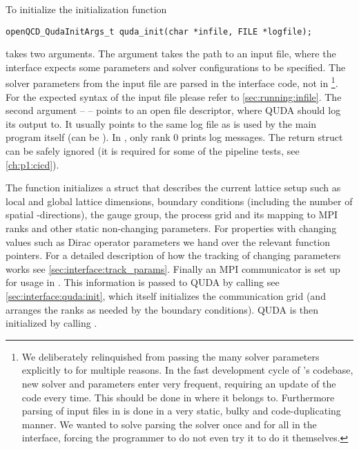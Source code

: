 To initialize \quda the initialization function
\begin{verbatim}
openQCD_QudaInitArgs_t quda_init(char *infile, FILE *logfile);
\end{verbatim}
takes two arguments.
The  argument takes the path to an input file, where the interface expects some parameters and solver configurations to be specified.
The solver parameters from the input file are parsed in the interface code, not in \openqxd\footnote{We deliberately relinquished from passing the many solver parameters explicitly to \quda for multiple reasons. In the fast development cycle of \quda's codebase, new solver and parameters enter very frequent, requiring an update of the code every time. This should be done in \quda where it belongs to. Furthermore parsing of input files in \openqxd is done in a very static, bulky and code-duplicating manner. We wanted to solve parsing the solver once and for all in the interface, forcing the programmer to do not even try it to do it themselves.}.
For the expected syntax of the input file please refer to \cref{sec:running:infile}.
The second argument --  -- points to an open file descriptor, where QUDA should log its output to.
It usually points to the same log file as is used by the main program itself (can be ).
In \quda, only rank \num{0} prints log messages.
The return struct can be safely ignored (it is required for some of the pipeline tests, see \cref{ch:p1:cicd}).

The function initializes a struct that describes the current lattice setup such as
  local and global lattice dimensions,
  boundary conditions (including the number of spatial \Cstar-directions),
  the gauge group,
  the process grid and its mapping to MPI ranks
  and other static non-changing parameters.
For properties with changing values such as Dirac operator parameters we hand over the relevant function pointers.
For a detailed description of how the tracking of changing parameters works see \cref{sec:interface:track_params}.
Finally an MPI communicator is set up for usage in \quda.
This information is passed to QUDA by calling  see \cref{sec:interface:quda:init}, which itself initializes the communication grid (and arranges the ranks as needed by the boundary conditions). QUDA is then initialized by calling .

